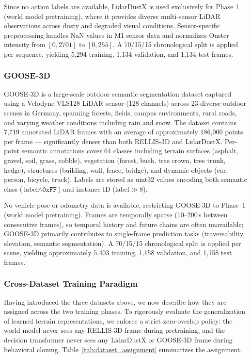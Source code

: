 \documentclass[sensors,article,submit,pdftex,moreauthors]{Definitions/mdpi}
\begin{document}
Since no action labels are available, LidarDustX is used exclusively for Phase 1 (world model pretraining), where it provides diverse multi-sensor LiDAR observations across dusty and degraded visual conditions. Sensor-specific preprocessing handles NaN values in M1 sensor data and normalizes Ouster intensity from $[0, 2701]$ to $[0, 255]$. A 70/15/15 chronological split is applied per sequence, yielding 5,294 training, 1,134 validation, and 1,134 test frames.

\subsubsection{GOOSE-3D}
GOOSE-3D \cite{goose2024} is a large-scale outdoor semantic segmentation dataset captured using a Velodyne VLS128 LiDAR sensor (128 channels) across 23 diverse outdoor scenes in Germany, spanning forests, fields, campus environments, rural roads, and varying weather conditions including rain and snow. The dataset contains 7,719 annotated LiDAR frames with an average of approximately 186,000 points per frame --- significantly denser than both RELLIS-3D and LidarDustX. Per-point semantic annotations cover 64 classes including terrain surfaces (asphalt, gravel, soil, grass, cobble), vegetation (forest, bush, tree crown, tree trunk, hedge), structures (building, wall, fence, bridge), and dynamic objects (car, person, bicycle, truck). Labels are stored as uint32 values encoding both semantic class ($\text{label} \wedge \texttt{0xFF}$) and instance ID ($\text{label} \gg 8$).

No vehicle pose or odometry data is available, restricting GOOSE-3D to Phase~1 (world model pretraining). Frames are temporally sparse (10--200\,s between consecutive frames), so temporal history and future chains are often unavailable; GOOSE-3D primarily contributes to single-frame prediction tasks (traversability, elevation, semantic segmentation). A 70/15/15 chronological split is applied per scene, yielding approximately 5,403 training, 1,158 validation, and 1,158 test frames.

\subsubsection{Cross-Dataset Training Paradigm}
\label{sec:cross_dataset_paradigm}

Having introduced the three datasets above, we now describe how they are assigned across the two training phases. To rigorously evaluate the generalization of learned terrain representations, we enforce a strict zero-overlap policy: the world model never sees any RELLIS-3D frame during pretraining, and the decision transformer never sees any LidarDustX or GOOSE-3D frame during behavioral cloning. Table~\ref{tab:dataset_assignment} summarizes the assignment.
\end{document}
